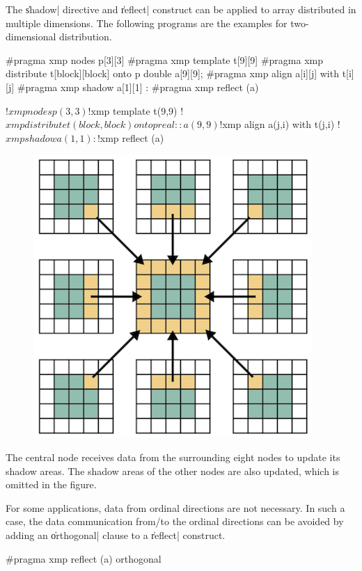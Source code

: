 The \|shadow| directive and \|reflect| construct can be applied to
array distributed in multiple dimensions. The following programs are the
examples for two-dimensional distribution.

\begin{XCexample}
#pragma xmp nodes p[3][3]
#pragma xmp template t[9][9]
#pragma xmp distribute t[block][block] onto p
double a[9][9];
#pragma xmp align a[i][j] with t[i][j]
#pragma xmp shadow a[1][1]
   :
#pragma xmp reflect (a)
\end{XCexample}

\begin{XFexample}
!$xmp nodes p(3,3)
!$xmp template t(9,9)
!$xmp distribute t(block,block) onto p
real :: a(9,9)
!$xmp align a(j,i) with t(j,i)
!$xmp shadow a(1,1)
   :
!$xmp reflect (a)
\end{XFexample}

\begin{figure}
  \centering
  \includegraphics{figs/multi1.png}
\end{figure}

The central node receives data from the surrounding eight
nodes to update its shadow areas. The shadow areas of the other nodes
are also updated, which is omitted in the figure.

For some applications, data from ordinal directions are not
necessary. In such a case, the data communication from/to the ordinal
directions can be avoided by adding an \|orthogonal| clause to a
\|reflect| construct.

\begin{XCexample}
#pragma xmp reflect (a) orthogonal
\end{XCexample}

